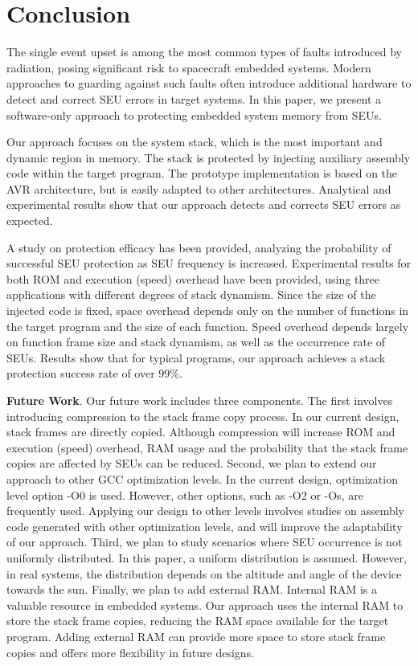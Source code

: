 \vspace{-15pt}
\section{Conclusion}\label{sec:conclusion}
\vspace{-10pt}
The single event upset is among the most common types of faults introduced by radiation, posing significant risk to spacecraft embedded systems. Modern approaches to guarding against such faults often introduce additional hardware to detect and correct SEU errors in target systems. In this paper, we present a software-only approach to protecting embedded system memory from SEUs. 

Our approach focuses on the system stack, which is the most important and dynamic region in memory. The stack is protected by injecting auxiliary assembly code within the target program. The prototype implementation is based on the AVR architecture, but is easily adapted to other architectures. Analytical and experimental results show that our approach detects and corrects SEU errors as expected. 

A study on protection efficacy has been provided, analyzing the probability of successful SEU protection as SEU frequency is increased. Experimental results for both ROM and execution (speed) overhead have been provided, using three applications with different degrees of stack dynamism. Since the size of the injected code is fixed, space overhead depends only on the number of functions in the target program and the size of each function. Speed overhead depends largely on function frame size and stack dynamism, as well as the occurrence rate of SEUs. Results show that for typical programs, our approach achieves a stack protection success rate of over 99\%.

{\bf Future Work}. Our future work includes three components. The first involves introducing compression to the stack frame copy process. In our current design, stack frames are directly copied. Although compression will increase ROM and execution (speed) overhead, RAM usage and the probability that the stack frame copies are affected by SEUs can be reduced. Second, we plan to extend our approach to other GCC optimization levels. In the current design, optimization level option -O0 is used. However, other options, such as -O2 or -Os, are frequently used. Applying our design to other levels involves studies on assembly code generated with other optimization levels, and will improve the adaptability of our approach. Third, we plan to study scenarios where SEU occurrence is not uniformly distributed. In this paper, a uniform distribution is assumed. However, in real systems, the distribution depends on the altitude and angle of the device towards the sun. Finally, we plan to add external RAM. Internal RAM is a valuable resource in embedded systems. Our approach uses the internal RAM to store the stack frame copies, reducing the RAM space available for the target program. Adding external RAM can provide more space to store stack frame copies and offers more flexibility in future designs.

